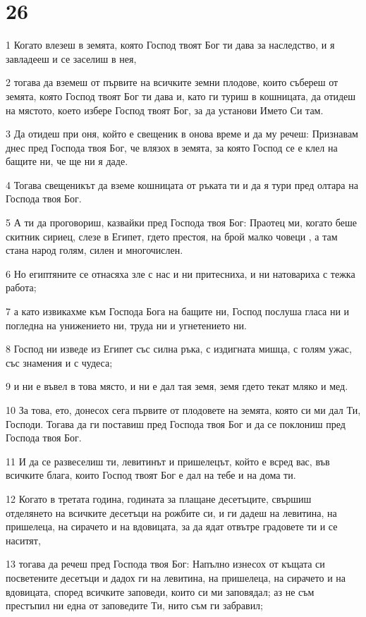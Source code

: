 \chapter{26}

\par 1 Когато влезеш в земята, която Господ твоят Бог ти дава за наследство, и я завладееш и се заселиш в нея,
\par 2 тогава да вземеш от първите на всичките земни плодове, които събереш от земята, която Господ твоят Бог ти дава и, като ги туриш в кошницата, да отидеш на мястото, което избере Господ твоят Бог, за да установи Името Си там.
\par 3 Да отидеш при оня, който е свещеник в онова време и да му речеш: Признавам днес пред Господа твоя Бог, че влязох в земята, за която Господ се е клел на бащите ни, че ще ни я даде.
\par 4 Тогава свещеникът да вземе кошницата от ръката ти и да я тури пред олтара на Господа твоя Бог.
\par 5 А ти да проговориш, казвайки пред Господа твоя Бог: Праотец ми, когато беше скитник сириец, слезе в Египет, гдето престоя, на брой малко човеци , а там стана народ голям, силен и многочислен.
\par 6 Но египтяните се отнасяха зле с нас и ни притесниха, и ни натовариха с тежка работа;
\par 7 а като извикахме към Господа Бога на бащите ни, Господ послуша гласа ни и погледна на унижението ни, труда ни и угнетението ни.
\par 8 Господ ни изведе из Египет със силна ръка, с издигната мишца, с голям ужас, със знамения и с чудеса;
\par 9 и ни е въвел в това място, и ни е дал тая земя, земя гдето текат мляко и мед.
\par 10 За това, ето, донесох сега първите от плодовете на земята, която си ми дал Ти, Господи. Тогава да ги поставиш пред Господа твоя Бог и да се поклониш пред Господа твоя Бог.
\par 11 И да се развеселиш ти, левитинът и пришелецът, който е всред вас, във всичките блага, които Господ твоят Бог е дал на тебе и на дома ти.
\par 12 Когато в третата година, годината за плащане десетъците, свършиш отделянето на всичките десетъци на рожбите си, и ги дадеш на левитина, на пришелеца, на сирачето и на вдовицата, за да ядат отвътре градовете ти и се наситят,
\par 13 тогава да речеш пред Господа твоя Бог: Напълно изнесох от къщата си посветените десетъци и дадох ги на левитина, на пришелеца, на сирачето и на вдовицата, според всичките заповеди, които си ми заповядал; аз не съм престъпил ни една от заповедите Ти, нито съм ги забравил;
